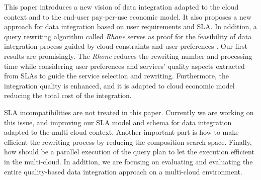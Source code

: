 This paper introduces a new vision of data integration adapted to the cloud context and to the end-user pay-per-use economic model. It also proposes a new approach for data integration based on user requirements and SLA. In addition, a query rewriting algorithm called \textit{Rhone} serves as proof for the feasibility of data integration process guided by cloud constraints and user preferences . Our first results are promisingly. The \textit{Rhone} reduces the rewriting number and processing time while considering user preferences and services' quality aspects extracted from SLAs to guide the service selection and rewriting. Furthermore, the integration quality is enhanced, and it is adapted to cloud economic model reducing the total cost of the integration.

SLA incompatibilities are not treated in this paper. Currently we are working on this issue, and improving our SLA model and schema for data integration adapted to the multi-cloud context.  Another important part is how to make efficient the rewriting process by reducing the composition search space. Finally, how should be a parallel execution of the query plan to let the execution efficient in the multi-cloud. In addition, we are focusing on evaluating and evaluating the entire quality-based data integration approach on a multi-cloud environment. 